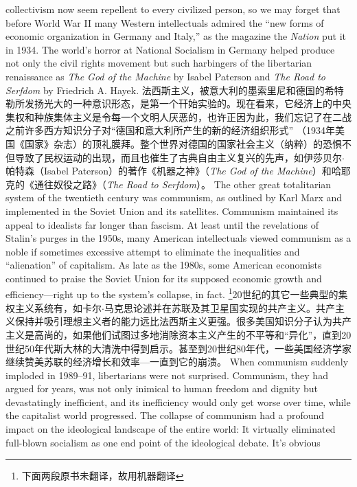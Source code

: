 \begin{paracol}{2}
collectivism now seem repellent to every civilized person, so we
may forget that before World War II many Western intellectuals admired the ``new forms of economic organization in Germany and Italy,'' as the magazine the \textit{Nation} put it in 1934. The
world's horror at National Socialism in Germany helped produce not only the civil rights movement but such harbingers of
the libertarian renaissance as \textit{The God of the Machine} by Isabel
Paterson and \textit{The Road to Serfdom} by Friedrich A. Hayek.
\switchcolumn
法西斯主义，被意大利的墨索里尼和德国的希特勒所发扬光大的一种意识形态，是第一个幵始实验的。现在看来，它经济上的中央集权和种族集体主义是令每一个文明人厌恶的，也许正因为此，我们忘记了在二战之前许多西方知识分子对“德国和意大利所产生的新的经济组织形式”  （1934年美国《国家》杂志）的顶礼膜拜。整个世界对德国的国家社会主义（纳粹）的恐惧不但导致了民权运动的出现，而且也催生了古典自由主义复兴的先声，如伊莎贝尔$\cdot$帕特森（Isabel  Paterson）的著作《机器之神》（\textit{The God of the Machine}）和哈耶克的《通往奴役之路》（\textit{The Road to Serfdom}）。 
\switchcolumn*
The other great totalitarian system of the twentieth century
was communism, as outlined by Karl Marx and implemented in
the Soviet Union and its satellites. Communism maintained its
appeal to idealists far longer than fascism. At least until the revelations of Stalin's purges in the 1950s, many American intellectuals viewed communism as a noble if sometimes excessive
attempt to eliminate the inequalities and ``alienation'' of capitalism. As late as the 1980s, some American economists continued to praise the Soviet Union for its supposed economic
growth and efficiency---right up to the system's collapse, in fact.
\switchcolumn
\footnote{下面两段原书未翻译，故用机器翻译}20世纪的其它一些典型的集权主义系统有，如卡尔$\cdot$马克思论述并在苏联及其卫星国实现的共产主义。共产主义保持并吸引理想主义者的能力远比法西斯主义更强。很多美国知识分子认为共产主义是高尚的，如果他们试图过多地消除资本主义产生的不平等和“异化”，直到20世纪50年代斯大林的大清洗中得到启示。甚至到20世纪80年代，一些美国经济学家继续赞美苏联的经济增长和效率---一直到它的崩溃。
\switchcolumn*
When communism suddenly imploded in 1989--91, libertarians were not surprised. Communism, they had argued for years, was not only inimical to human freedom and dignity but
devastatingly inefficient, and its inefficiency would only get
worse over time, while the capitalist world progressed. The collapse of communism had a profound impact on the ideological landscape of the entire world: It virtually eliminated full-blown
socialism as one end point of the ideological debate. It's obvious

\end{paracol}
